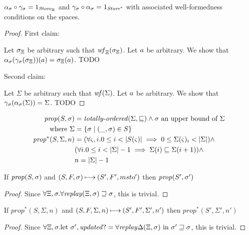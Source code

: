 \documentclass{llncs}
\newcommand{\prop}{\mathit{prop}}
\begin{document}
\begin{lemma}
  $\alpha_\sigma \circ \gamma_\sigma = 1_{\mathit{Store}_{\Xi}}$ and
  $\gamma_\sigma \circ \alpha_\sigma = 1_{\mathit{Store}^*}$ with associated
  well-formedness conditions on the spaces.
\end{lemma}
\begin{proof}
First claim:

Let $\sigma_{\Xi}$ be arbitrary such that $\mathit{wf}_{\Xi}(\sigma_{\Xi})$. Let $a$ be arbitrary.
We show that $\alpha_\sigma(\gamma_\sigma(\sigma_{\Xi}))(a) = \sigma_{\Xi}(a)$.
TODO

Second claim:

Let $\Sigma$ be arbitrary such that $\mathit{wf}(\Sigma)$. Let $a$ be arbitrary.
We show that $\gamma_\sigma(\alpha_\sigma(\Sigma)) = \Sigma$.
TODO
\end{proof}

\begin{align*}
\prop(S,\msto) &= \mathit{totally\text{-}ordered}(\Sigma, \sqsubseteq) \wedge \msto \text{ an upper bound of } \Sigma \\
 \text{ where } \Sigma &= \setof{\msto \mid (\_,\msto) \in S} \\
\prop^*(S,\Sigma,n) &= (\forall \mstate, i. 0 \le i < |S(\mstate)| \implies 0 \le \Sigma(\mstate)_i < |\Sigma|) \wedge \\
                  &(\forall i. 0 \le i < |\Sigma|-1 \implies \Sigma(i) \sqsubseteq \Sigma(i+1)) \wedge \\
                  &n = |\Sigma| - 1
\end{align*}

\begin{lemma}\label{monstore}
If $\prop(S,\msto)$ and $(S,F,\sigma) \mathbin{\longmapsto} (S',F',msto')$ then $\prop(S',\msto')$
\end{lemma}
\begin{proof}
Since $\forall \Xi,\sigma.\forall\mathit{replay}(\Xi,\sigma) \sqsupseteq \sigma$, this is trivial.
\end{proof}

\begin{lemma}\label{montime}
If $\prop^*(S,\Sigma,n)$ and $(S,F,\Sigma,n) \mathbin{\longmapsto} (S',F',\Sigma',n')$ then $\prop^*(S',\Sigma',n')$
\end{lemma}
\begin{proof}
Since $\forall \Xi,\sigma. \text{let } \sigma',\mathit{updated?} = \forall\mathit{replay}\Delta(\Xi,\sigma) \text{ in } \sigma' \sqsupseteq \sigma$,
this is trivial.
\end{proof}
\end{document}

